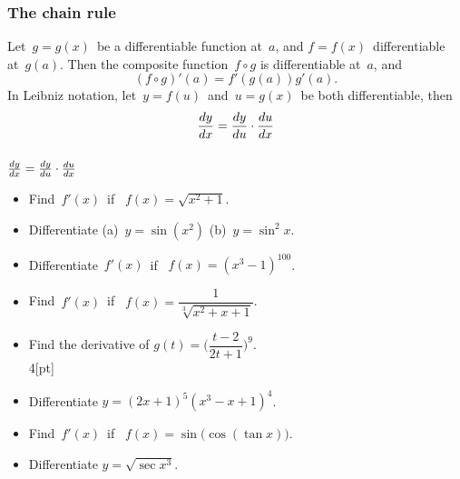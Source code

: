 
 \begin{frame}[fragile] \frametitle{The chain rule}
Let\ $g=g(x)$\ be a differentiable function at\ $a$, and $f=f(x)$\ differentiable at\ $g(a)$. Then the composite function\ $f\circ g$ is differentiable at\ $a$, and
{\[ (f\circ g)'(a) = f'(g(a)) g'(a) .\]}
In Leibniz notation, let\ $y=f(u)$\ and\ $u=g(x)$\ be both differentiable, then
{\[\frac{d {y} }{d x} = \frac{d y}{d u} \cdot \frac{d {u} }{d x} \]}
\end{frame}

 \begin{frame}[fragile] \frametitle{}

$\frac{d {y} }{d x} = \frac{d y}{d u} \cdot \frac{d {u} }{d x} $

\begin{itemize}
	\item Find\ $f'(x)$\ if \ $f(x)=\sqrt{x^2+1}$. \\
	\item Differentiate\; (a)\ $y=\sin (x^2)$ \quad  (b)\ $y=\sin^2 x$.
	\item Differentiate\ $f'(x)$\ if \ $f(x)=(x^3-1)^{100}$. \\
	\item Find\  $f'(x)$\ if \ $f(x)=\dfrac{1}{\sqrt[3]{x^2+x+1}}$. 
\end{itemize}


\begin{itemize}
	\item Find the derivative of\; $g(t)= \big( \dfrac{t-2}{2t+1} \big)^9$.\\4[pt]
	\item Differentiate\; $y=(2x+1)^5(x^3-x+1)^4$. \\
	\item Find\  $f'(x)$\ if \ $f(x)=\sin \big( \cos ( \tan x ) \big)$. 
	\item Differentiate\; $y=\sqrt{\sec x^3}$.	
\end{itemize}


\end{frame}

